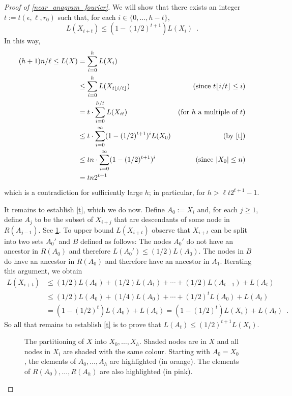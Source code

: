 \documentclass{patmorin}
\begin{document}
\begin{proof}[Proof of \cref{near_anagram_fourier}]
  We will show that there exists an integer $t:=t(\epsilon,\ell,r_0)$ such that, for each $i\in\{0,\ldots,h-t\}$,
  \begin{equation}
     L(X_{i+t}) \le (1-(1/2)^{t+1}) L(X_i) \enspace . \label{t}
  \end{equation}
  In this way,
  \begin{align*}
     (h+1)n/\ell
        \le L(X) & = \sum_{i=0}^{h} L(X_i) \\
           &\le \sum_{i=0}^{h} L(X_{t\floor{i/t}})
             & \text{(since $t\floor{i/t}\le i$)} \\
           & = t\cdot\sum_{i=0}^{h/t} L(X_{it})
             & \text{(for $h$ a multiple of $t$)} \\
           &\le t\cdot\sum_{i=0}^{\infty} (1-(1/2)^{t+1})^i L(X_0)
           & \text{(by \cref{t})}\\
           &\le tn\cdot \sum_{i=0}^{\infty} (1-(1/2)^{t+1})^i
           & \text{(since $|X_0|\le n$)} \\
           & = tn2^{t+1} \\
  \end{align*}
  which is a contradiction for sufficiently large $h$; in particular, for $h > \ell t2^{t+1}-1$.

  It remains to establish \cref{t}, which we do now.  Define $A_0:= X_i$ and, for each $j\ge 1$, define $A_j$ to be the subset of $X_{i+j}$ that are descendants of some node in $R(A_{j-1})$.  See \cref{bigtree}.  To upper bound $L(X_{i+t})$ observe that $X_{i+t}$ can be split into two sets $A_0'$ and $B$ defined as follows:  The nodes $A_0'$ do not have an ancestor in $R(A_0)$ and therefore $L(A_0')\le (1/2)L(A_0)$. The nodes in $B$ do have an ancestor in $R(A_0)$ and therefore have an ancestor in $A_1$.  Iterating this argument, we obtain
 \begin{align*}
      L(X_{i+t})
         &\le (1/2)L(A_0) + (1/2)L(A_1) + \cdots + (1/2)L(A_{t-1}) + L(A_t) \\
         &\le (1/2)L(A_0) + (1/4)L(A_0) + \cdots + (1/2)^t L(A_{0}) + L(A_t) \\
         &  = (1-(1/2)^t)L(A_0) + L(A_t) = (1-(1/2)^t)L(X_i) + L(A_t)  \enspace .
   \end{align*}
  So all that remains to establish \ref{t} is to prove that
  $L(A_t)\le (1/2)^{t+1}L(X_i)$.

  \begin{figure}
    \caption{The partitioning of $X$ into $X_0,\ldots,X_h$. Shaded
    nodes are in $X$ and all nodes in $X_i$ are shaded with the same
    colour.   Starting with $A_0=X_0$, the elements of $A_0,\ldots,A_h$
    are highlighted (in orange).  The elements of $R(A_0),\ldots,R(A_h)$ are also highlighted (in pink).}
    \label{bigtree}
  \end{figure}


\end{proof}
\end{document}
